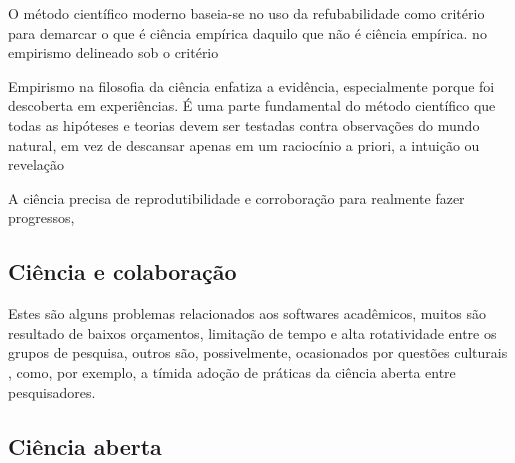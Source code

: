 

O método científico moderno baseia-se no uso da refubabilidade como critério para
demarcar o que é ciência empírica daquilo que não é ciência empírica.
no empirismo delineado sob o critério

Empirismo na filosofia da ciência enfatiza a evidência, especialmente porque
foi descoberta em experiências. É uma parte fundamental do método científico
que todas as hipóteses e teorias devem ser testadas contra observações do mundo
natural, em vez de descansar apenas em um raciocínio a priori, a intuição ou
revelação

A ciência precisa de reprodutibilidade e corroboração para realmente fazer
progressos,


\subsection{Ciência e colaboração}


Estes são alguns problemas relacionados aos softwares acadêmicos, muitos são
resultado de baixos orçamentos, limitação de tempo e alta rotatividade entre os
grupos de pesquisa, outros são, possivelmente, ocasionados por questões
culturais \cite{niemeyer2017open}, como, por exemplo, a tímida adoção de
práticas da ciência aberta entre pesquisadores.


\subsection{Ciência aberta}

